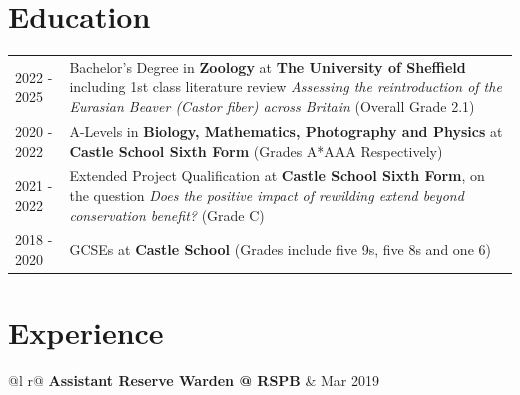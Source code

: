 \documentclass[a4paper,12pt]{article}
\begin{document}
\section{Education}
\begin{tabularx}{\linewidth}{@{}l X@{}}	
2022 - 2025 & Bachelor's Degree in \textbf{Zoology} at \textbf{The University of Sheffield} including 1st class literature review \textit{Assessing the reintroduction of the Eurasian Beaver (Castor fiber) across Britain}  \hfill (Overall Grade 2.1) \normalsize  \\

2020 - 2022 & A-Levels in \textbf{Biology, Mathematics, Photography and Physics} at \textbf{Castle School Sixth Form} \hfill (Grades A*AAA Respectively) \\ 

2021 - 2022 & Extended Project Qualification at \textbf{Castle School Sixth Form}, on the question \textit{Does the positive impact of rewilding extend beyond conservation benefit?} \hfill  (Grade C) \\

2018 - 2020 & GCSEs at \textbf{Castle School} \hfill  (Grades include five 9s, five 8s and one 6) \\
\end{tabularx}


\section{Experience}

\begin{tabularx}{\linewidth}{ @{}l r@{} }
\textbf{Assistant Reserve Warden @ RSPB} & \hfill Mar 2019 \\[3.75pt]
\end{tabularx}
\end{document}
